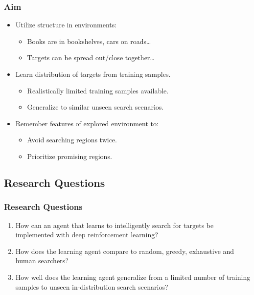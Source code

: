 \begin{frame}
    \frametitle{Aim}
    
    \begin{itemize}
        \item Utilize structure in environments:
        \begin{itemize}
            \item Books are in bookshelves, cars on roads\dots
            \item Targets can be spread out/close together\dots
        \end{itemize}
        \item Learn distribution of targets from training samples.
        \begin{itemize}
            \item Realistically limited training samples available.
            \item Generalize to similar unseen search scenarios.
        \end{itemize}
        \item Remember features of explored environment to:
        \begin{itemize}
            \item Avoid searching regions twice.
            \item Prioritize promising regions.
        \end{itemize}
    \end{itemize}
\end{frame}

\subsection{Research Questions}

\begin{frame}
    \frametitle{Research Questions}
    \begin{enumerate}
        \item How can an agent that learns to intelligently search for targets be implemented with deep reinforcement learning?
        \item How does the learning agent compare to random, greedy, exhaustive and human searchers?
        \item How well does the learning agent generalize from a limited number of training samples to unseen in-distribution search scenarios?
    \end{enumerate}    
\end{frame}